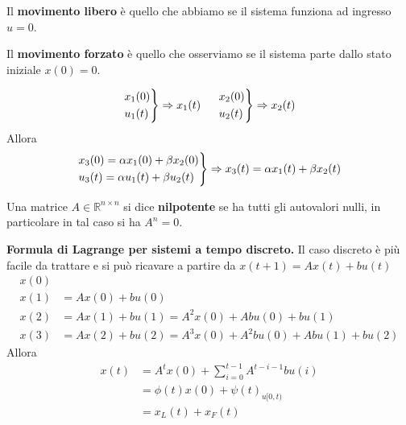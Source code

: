 \documentclass[10pt,a4paper]{book}
\begin{document}
Il \textbf{movimento libero} è quello che abbiamo se il sistema funziona ad ingresso $u=0$.

Il \textbf{movimento forzato} è quello che osserviamo se il sistema parte dallo stato iniziale $x( 0) =0$.
\begin{theorem}
\begin{equation*}
\begin{drcases}
x_1( 0)\\
u_1(t)
\end{drcases} \Rightarrow x_1(t) \ \ \ \ \begin{drcases}
x_2( 0)\\
u_2(t)
\end{drcases} \Rightarrow x_2(t)
\end{equation*}
Allora
\begin{equation*}
\begin{drcases}
x_3( 0) =\alpha x_1( 0) +\beta x_2( 0)\\
u_3(t) =\alpha u_1(t) +\beta u_2(t)
\end{drcases} \Rightarrow x_3(t) =\alpha x_1(t) +\beta x_2(t)
\end{equation*}
\end{theorem}
\begin{ricalg}
Una matrice $A\in \mathbb{R}^{n\times n}$ si dice \textbf{nilpotente} se ha tutti gli autovalori nulli, in particolare in tal caso si ha $A^n =0$.
\end{ricalg}
\textbf{Formula di Lagrange per sistemi a tempo discreto.} Il caso discreto è più facile da trattare e si può ricavare a partire da $x(t+1)=Ax(t)+bu(t)$
\begin{equation*}
\begin{aligned}
x( 0) & \\
x( 1) & =Ax( 0) +bu( 0)\\
x( 2) & =Ax( 1) +bu( 1) =A^2 x( 0) +Abu( 0) +bu( 1)\\
x( 3) & =Ax( 2) +bu( 2) =A^3 x( 0) +A^2 bu( 0) +Abu( 1) +bu( 2)
\end{aligned}
\end{equation*}
Allora
\begin{equation}
\boxed{\begin{aligned}
x(t) & =A^t x( 0) +\sum\limits ^{t-1}_{i=0} A^{t-i-1} bu( i)\\
 & =\phi (t) x( 0) +\psi (t)_{u[ 0,t)}\\
 & =x_L(t) +x_F(t)
\end{aligned}}
\end{equation}
\end{document}
